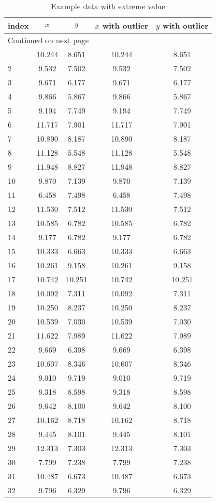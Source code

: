 \newpage
\begin{longtable}{lcccc}
\caption{Example data with extreme value \label{tab:outdata}} \\
index & $x$ & $y$ & $x$ with outlier & $y$ with outlier \\
\hline
\endhead
\hline \multicolumn{5}{l}{{Continued on next page}} \\ \hline
\endfoot
\endlastfoot
1&10.244&8.651&10.244&8.651\\
2&9.532&7.502&9.532&7.502\\
3&9.671&6.177&9.671&6.177\\
4&9.866&5.867&9.866&5.867\\
5&9.194&7.749&9.194&7.749\\
6&11.717&7.901&11.717&7.901\\
7&10.890&8.187&10.890&8.187\\
8&11.128&5.548&11.128&5.548\\
9&11.948&8.827&11.948&8.827\\
10&9.870&7.139&9.870&7.139\\
11&6.458&7.498&6.458&7.498\\
12&11.530&7.512&11.530&7.512\\
13&10.585&6.782&10.585&6.782\\
14&9.177&6.782&9.177&6.782\\
15&10.333&6.663&10.333&6.663\\
16&10.261&9.158&10.261&9.158\\
17&10.742&10.251&10.742&10.251\\
18&10.092&7.311&10.092&7.311\\
19&10.250&8.237&10.250&8.237\\
20&10.539&7.030&10.539&7.030\\
21&11.622&7.989&11.622&7.989\\
22&9.669&6.398&9.669&6.398\\
23&10.607&8.346&10.607&8.346\\
24&9.010&9.719&9.010&9.719\\
25&9.318&8.598&9.318&8.598\\
26&9.642&8.100&9.642&8.100\\
27&10.162&8.718&10.162&8.718\\
28&9.445&8.101&9.445&8.101\\
29&12.313&7.303&12.313&7.303\\
30&7.799&7.238&7.799&7.238\\
31&10.487&6.673&10.487&6.673\\
32&9.796&6.329&9.796&6.329\\

\end{longtable}
